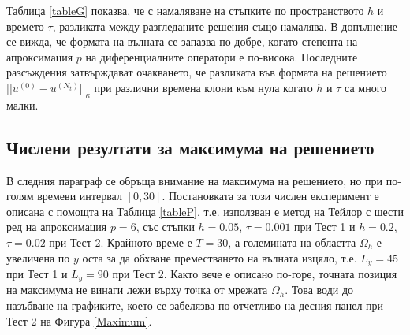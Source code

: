 \documentclass{article}
\begin{document}
\FloatBarrier
Таблица \ref{tableG} показва, че с намаляване на стъпките по пространството $h$ и времето $\tau$, разликата между разгледаните решения също намалява. В допълнение се вижда, че формата на вълната се запазва по-добре, когато степента на апроксимация $p$ на диференциалните оператори е по-висока. Последните разсъждения затвърждават очакването, че разликата във формата на решението $||u^{(0)} - u^{(N_t)}||_\kappa$ при различни времена клони към нула когато $h$ и $\tau$ са много малки.

\subsection{Числени резултати за максимума на решението}
В следния параграф се обръща внимание на максимума на решението, но при по-голям времеви интервал $[0, 30]$. Постановката за този числен експеримент е описана с помощта на Таблица \ref{tableP}, т.е. използван е метод на Тейлор с шести ред на апроксимация $p=6$, със стъпки $h=0.05$, $\tau = 0.001$ при Тест 1 и $h=0.2$,  $\tau=0.02$ при Тест 2. Крайното време е $T=30$, а големината на областта $\Omega_h$ е увеличена по $y$ оста за да обхване преместването на вълната изцяло, т.е. $L_y = 45$ при Тест 1 и $L_y = 90$ при Тест 2. Както вече е описано по-горе, точната позиция на максимума не винаги лежи върху точка от мрежата $\Omega_h$. Това води до назъбване на графиките, което се забелязва по-отчетливо на десния панел при Тест 2 на Фигура \ref{Maximum}. 
\end{document}
